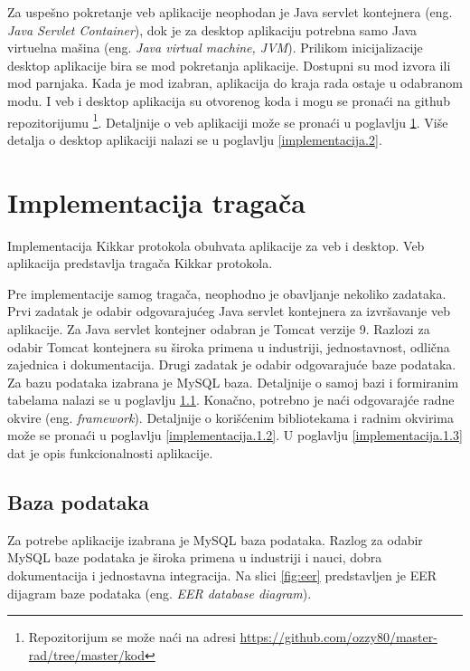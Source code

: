 \documentclass[12pt,oneside]{memoir}
\begin{document}
Za uspešno pokretanje veb aplikacije neophodan je Java servlet kontejnera (eng. \textit{Java Servlet Container}), dok je za desktop aplikaciju potrebna samo Java virtuelna mašina (eng. \textit{Java virtual machine, JVM}). Prilikom inicijalizacije desktop aplikacije bira se mod pokretanja aplikacije. Dostupni su mod izvora ili mod parnjaka. Kada je mod izabran, aplikacija do kraja rada ostaje u odabranom modu. I veb i desktop aplikacija su otvorenog koda i mogu se pronaći na github repozitorijumu \footnote{Repozitorijum se može naći na adresi \url{https://github.com/ozzy80/master-rad/tree/master/kod}}. Detaljnije o veb aplikaciji može se pronaći u poglavlju \ref{implementacija.1}. Više detalja o desktop aplikaciji nalazi se u poglavlju \ref{implementacija.2}.

\section{Implementacija tragača}
\label{implementacija.1}

Implementacija Kikkar protokola obuhvata aplikacije za veb i desktop. Veb aplikacija predstavlja tragača Kikkar protokola. 


Pre implementacije samog tragača, neophodno je obavljanje nekoliko zadataka.
Prvi zadatak je odabir odgovarajućeg Java servlet kontejnera za izvršavanje veb aplikacije. Za Java servlet kontejner odabran je Tomcat \cite{Tomcat} verzije 9. Razlozi za odabir Tomcat kontejnera su široka primena u industriji, jednostavnost, odlična zajednica i dokumentacija. Drugi zadatak je odabir odgovarajuće baze podataka. Za bazu podataka izabrana je MySQL \cite{Mysql} baza. Detaljnije o samoj bazi i formiranim tabelama nalazi se u poglavlju \ref{implementacija.1.1}. Konačno, potrebno je naći odgovarajće radne okvire (eng. \textit{framework}). Detaljnije o korišćenim bibliotekama i radnim okvirima može se pronaći u poglavlju \ref{implementacija.1.2}. U poglavlju \ref{implementacija.1.3} dat je opis funkcionalnosti aplikacije.

\subsection{Baza podataka}
\label{implementacija.1.1}

Za potrebe aplikacije izabrana je MySQL \cite{Mysql} baza podataka. Razlog za odabir MySQL baze podataka je široka primena u industriji i nauci, dobra dokumentacija i jednostavna integracija. Na slici \ref{fig:eer} predstavljen je EER dijagram baze podataka (eng. \textit{EER database diagram}). 
\end{document}
